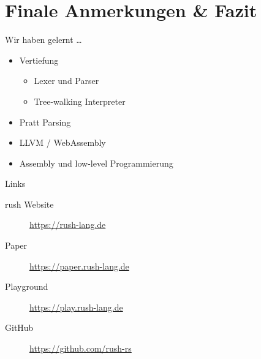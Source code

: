 \section{Finale Anmerkungen \& Fazit}
\begin{frame}{Wir haben gelernt \dots}
	\begin{itemize}
		\item<1-> Vertiefung
			\begin{itemize}
				\item <2-> Lexer und Parser
				\item <3-> Tree-walking Interpreter
			\end{itemize}
		\item<4-> Pratt Parsing
		\item<5-> LLVM / WebAssembly
		\item<6-> Assembly und low-level Programmierung
	\end{itemize}
\end{frame}

\begin{frame}{Links}
	\centering
	\begin{minipage}{.5\textwidth}
		\begin{description}
			\item[rush Website] \url{https://rush-lang.de}
			\item[Paper] \url{https://paper.rush-lang.de}
			\item[Playground] \url{https://play.rush-lang.de}
			\item[GitHub] \url{https://github.com/rush-rs}
		\end{description}
	\end{minipage}
\end{frame}
